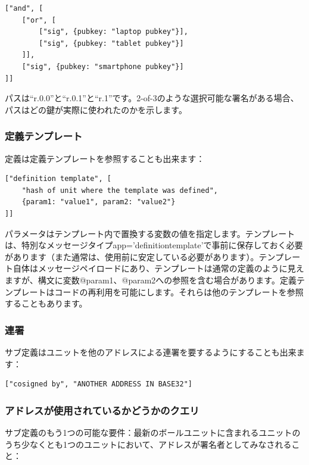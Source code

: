 \documentclass[a4paper, dvipdfmx]{jsarticle}
\begin{document}
\begin{lstlisting}[basicstyle=\ttfamily\footnotesize, frame=none]
["and", [
    ["or", [
        ["sig", {pubkey: "laptop pubkey"}],
        ["sig", {pubkey: "tablet pubkey"}]
    ]],
    ["sig", {pubkey: "smartphone pubkey"}]
]]
\end{lstlisting}

\noindent パスは“r.0.0”と“r.0.1”と“r.1”です。2-of-3のような選択可能な署名がある場合、パスはどの鍵が実際に使われたのかを示します。

\subsubsection{定義テンプレート}
定義は定義テンプレートを参照することも出来ます：

\begin{lstlisting}[basicstyle=\ttfamily\footnotesize, frame=none]
["definition template", [
    "hash of unit where the template was defined",
    {param1: "value1", param2: "value2"}
]]
\end{lstlisting}

\noindent パラメータはテンプレート内で置換する変数の値を指定します。テンプレートは、特別なメッセージタイプapp=’definition\textunderscore template’で事前に保存しておく必要があります（また通常は、使用前に安定している必要があります）。テンプレート自体はメッセージペイロードにあり、テンプレートは通常の定義のように見えますが、構文に変数@param1、@param2への参照を含む場合があります。定義テンプレートはコードの再利用を可能にします。それらは他のテンプレートを参照することもあります。

\subsubsection{連署}
サブ定義はユニットを他のアドレスによる連署を要するようにすることも出来ます：

\begin{lstlisting}[basicstyle=\ttfamily\footnotesize, frame=none]
["cosigned by", "ANOTHER ADDRESS IN BASE32"]
\end{lstlisting}

\subsubsection{アドレスが使用されているかどうかのクエリ}
サブ定義のもう1つの可能な要件：最新のボールユニットに含まれるユニットのうち少なくとも1つのユニットにおいて、アドレスが署名者としてみなされること：
\end{document}
